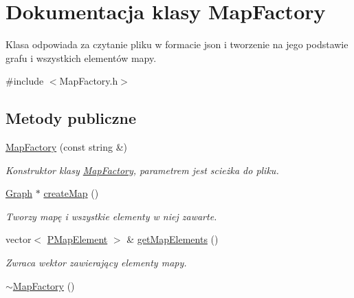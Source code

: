 \hypertarget{class_map_factory}{\section{Dokumentacja klasy Map\-Factory}
\label{class_map_factory}
}


Klasa odpowiada za czytanie pliku w formacie json i tworzenie na jego podstawie grafu i wszystkich elementów mapy.  




{\ttfamily \#include $<$Map\-Factory.\-h$>$}

\subsection*{Metody publiczne}
\begin{DoxyCompactItemize}
\item 
\hyperlink{class_map_factory_aad57a8dceca114847cc97579aaa6f569}{Map\-Factory} (const string \&)
\begin{DoxyCompactList}\small\item\em Konstruktor klasy \hyperlink{class_map_factory}{Map\-Factory}, parametrem jest scieżka do pliku. \end{DoxyCompactList}\item 
\hyperlink{_types_8h_adb8cbccb1bf63dda03515e30e185c388}{Graph} $\ast$ \hyperlink{class_map_factory_a22c43a80224a98a9ad11f9e38dcda29b}{create\-Map} ()
\begin{DoxyCompactList}\small\item\em Tworzy mapę i wszystkie elementy w niej zawarte. \end{DoxyCompactList}\item 
vector$<$ \hyperlink{_types_8h_a4260a5280323637f8a1fa28e89b6ef14}{P\-Map\-Element} $>$ \& \hyperlink{class_map_factory_a49c90b6c269407a3fc71d103edd6ff9e}{get\-Map\-Elements} ()
\begin{DoxyCompactList}\small\item\em Zwraca wektor zawierający elementy mapy. \end{DoxyCompactList}\item 
\hyperlink{class_map_factory_a21d7130504a10cc0886c26326b2faa9d}{$\sim$\-Map\-Factory} ()
\end{DoxyCompactItemize}
